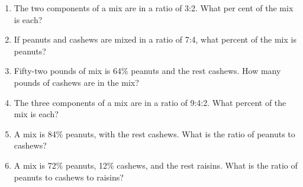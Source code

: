 \documentclass[12pt]{article}
\begin{document}
\begin{enumerate}
\item The two components of a mix are in a ratio of 3:2. What per cent of the mix is each? 
  \spacing

\item If peanuts and cashews are mixed in a ratio of 7:4, what percent of the mix is peanuts? 
  \spacing

\item Fifty-two pounds of mix is 64\% peanuts and the rest cashews. How many pounds of cashews are in the mix? 
  \spacing

\item The three components of a mix are in a ratio of 9:4:2. What percent of the mix is each? 
  \spacing

\item A mix is 84\% peanuts, with the rest cashews. What is the ratio of peanuts to cashews?
  \spacing

\item A mix is 72\% peanuts, 12\% cashews, and the rest raisins. What is the ratio of peanuts to cashews to raisins?
  \spacing

\end{enumerate}
\end{document}
